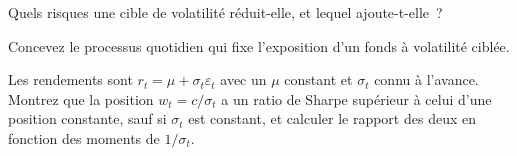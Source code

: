 \begin{interviewq}\label{iq:s1:volatility-targeting-and-risk-managed-portfolios:4}
Quels risques une cible de volatilité réduit-elle, et lequel ajoute-t-elle~?
\end{interviewq}

\begin{interviewq}\label{iq:s1:volatility-targeting-and-risk-managed-portfolios:5}
Concevez le processus quotidien qui fixe l'exposition d'un fonds à volatilité ciblée.
\end{interviewq}

\begin{interviewq}\label{iq:s1:volatility-targeting-and-risk-managed-portfolios:6}
Les rendements sont $r_t = \mu + \sigma_t\varepsilon_t$ avec un $\mu$ constant et $\sigma_t$ connu à l'avance. Montrez que la position $w_t = c/\sigma_t$ a un
ratio de Sharpe supérieur à celui d'une position constante, sauf si $\sigma_t$ est constant, et calculer le rapport des deux en fonction des moments de $1/\sigma_t$.
\end{interviewq}
